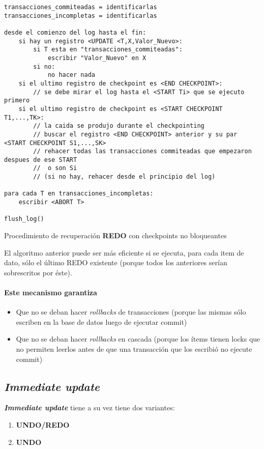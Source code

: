 \documentclass[a4paper, twoside]{article}
\begin{document}
\begin{algorithm}[H]
	\begin{lstlisting}
transacciones_commiteadas = identificarlas
transacciones_incompletas = identificarlas

desde el comienzo del log hasta el fin:
	si hay un registro <UPDATE <T,X,Valor_Nuevo>:
		si T esta en "transacciones_commiteadas":
			escribir "Valor_Nuevo" en X
		si no:
			no hacer nada
	si el ultimo registro de checkpoint es <END CHECKPOINT>:
		// se debe mirar el log hasta el <START Ti> que se ejecuto primero
	si el ultimo registro de checkpoint es <START CHECKPOINT T1,...,TK>:
		// la caida se produjo durante el checkpointing
		// buscar el registro <END CHECKPOINT> anterior y su par <START CHECKPOINT S1,...,SK>
		// rehacer todas las transacciones commiteadas que empezaron despues de ese START 
		//	o son Si
		// (si no hay, rehacer desde el principio del log)

para cada T en transacciones_incompletas:
	escribir <ABORT T>

flush_log()
	\end{lstlisting}
	\caption{Procedimiento de recuperación \textbf{REDO }con checkpoints no bloqueantes}
\end{algorithm}

El algoritmo anterior puede ser más eficiente si se ejecuta, para cada item de dato, sólo el último REDO existente (porque todos los anteriores serían sobrescritos por éste).

\paragraph{Este mecanismo garantiza}
\begin{itemize}
	\item Que no se deban hacer \emph{rollbacks} de transacciones (porque las mismas sólo escriben en la base de datos luego de ejecutar commit)
	\item Que no se deban hacer \emph{rollbacks} en cascada (porque los ítems tienen locks que no permiten leerlos antes de que una transacción que los escribió no ejecute commit)
\end{itemize}

\subsection{\emph{Immediate update}}
\textbf{\emph{Immediate update}} tiene a su vez tiene dos variantes:
\begin{enumerate}
	\item \textbf{UNDO/REDO}
	\item \textbf{UNDO}
\end{enumerate}
\end{document}
